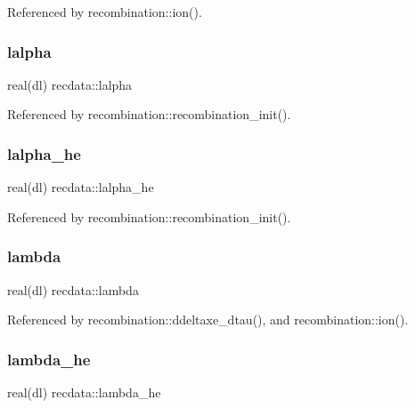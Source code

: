 Referenced by recombination\+::ion().

\mbox{\label{namespacerecdata_af77171b4139af45b976e7388f08ad74a}} 
\subsubsection{\texorpdfstring{lalpha}{lalpha}}
{\footnotesize\ttfamily real(dl) recdata\+::lalpha}



Referenced by recombination\+::recombination\+\_\+init().

\mbox{\label{namespacerecdata_aef43ee94c4fd432972ea10fe6e93f8bb}} 
\subsubsection{\texorpdfstring{lalpha\+\_\+he}{lalpha\_he}}
{\footnotesize\ttfamily real(dl) recdata\+::lalpha\+\_\+he}



Referenced by recombination\+::recombination\+\_\+init().

\mbox{\label{namespacerecdata_a2c475bdeb3e0999a1360325ceae144c2}} 
\subsubsection{\texorpdfstring{lambda}{lambda}}
{\footnotesize\ttfamily real(dl) recdata\+::lambda}



Referenced by recombination\+::ddeltaxe\+\_\+dtau(), and recombination\+::ion().

\mbox{\label{namespacerecdata_a2eac004fa1bc20ce7480574fc7e7f8ec}} 
\subsubsection{\texorpdfstring{lambda\+\_\+he}{lambda\_he}}
{\footnotesize\ttfamily real(dl) recdata\+::lambda\+\_\+he}



